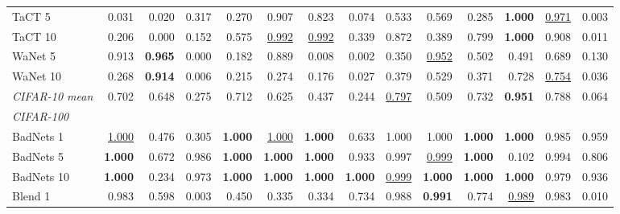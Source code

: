 \begin{table}[htbp]
\begin{adjustbox}{max width=\textwidth}
\begin{tabular}{lrrrrrrrrrrrrr}
TaCT 5 & \textcolor{black!45}{0.031} & \textcolor{black!45}{0.020} & \textcolor{black!45}{0.317} & \textcolor{black!45}{0.270} & 0.907 & 0.823 & \textcolor{black!45}{0.074} & 0.533 & 0.569 & \textcolor{black!45}{0.285} & \textbf{1.000} & \underline{0.971} & \textcolor{black!45}{0.003} \\
TaCT 10 & \textcolor{black!45}{0.206} & \textcolor{black!45}{0.000} & \textcolor{black!45}{0.152} & 0.575 & \underline{0.992} & \underline{0.992} & \textcolor{black!45}{0.339} & 0.872 & \textcolor{black!45}{0.389} & 0.799 & \textbf{1.000} & 0.908 & \textcolor{black!45}{0.011} \\
WaNet 5 & 0.913 & \textbf{0.965} & \textcolor{black!45}{0.000} & \textcolor{black!45}{0.182} & 0.889 & \textcolor{black!45}{0.008} & \textcolor{black!45}{0.002} & \textcolor{black!45}{0.350} & \underline{0.952} & 0.502 & \textcolor{black!45}{0.491} & 0.689 & \textcolor{black!45}{0.130} \\
WaNet 10 & \textcolor{black!45}{0.268} & \textbf{0.914} & \textcolor{black!45}{0.006} & \textcolor{black!45}{0.215} & \textcolor{black!45}{0.274} & \textcolor{black!45}{0.176} & \textcolor{black!45}{0.027} & \textcolor{black!45}{0.379} & 0.529 & \textcolor{black!45}{0.371} & 0.728 & \underline{0.754} & \textcolor{black!45}{0.036} \\
\rowcolor{black!8}\emph{CIFAR-10 mean} & 0.702 & 0.648 & \textcolor{black!45}{0.275} & 0.712 & 0.625 & \textcolor{black!45}{0.437} & \textcolor{black!45}{0.244} & \underline{0.797} & 0.509 & 0.732 & \textbf{0.951} & 0.788 & \textcolor{black!45}{0.064} \\
\multicolumn{14}{l}{\emph{CIFAR-100}} \\
BadNets 1 & \underline{1.000} & \textcolor{black!45}{0.476} & \textcolor{black!45}{0.305} & \textbf{1.000} & \underline{1.000} & \textbf{1.000} & 0.633 & 1.000 & 1.000 & \textbf{1.000} & \textbf{1.000} & 0.985 & 0.959 \\
BadNets 5 & \textbf{1.000} & 0.672 & 0.986 & \textbf{1.000} & \textbf{1.000} & \textbf{1.000} & 0.933 & 0.997 & \underline{0.999} & \textbf{1.000} & \textcolor{black!45}{0.102} & 0.994 & 0.806 \\
BadNets 10 & \textbf{1.000} & \textcolor{black!45}{0.234} & 0.973 & \textbf{1.000} & \textbf{1.000} & \textbf{1.000} & \textbf{1.000} & \underline{0.999} & \textbf{1.000} & \textbf{1.000} & \textbf{1.000} & 0.979 & 0.936 \\
Blend 1 & 0.983 & 0.598 & \textcolor{black!45}{0.003} & \textcolor{black!45}{0.450} & \textcolor{black!45}{0.335} & \textcolor{black!45}{0.334} & 0.734 & 0.988 & \textbf{0.991} & 0.774 & \underline{0.989} & 0.983 & \textcolor{black!45}{0.010} \\

\end{tabular}
\end{adjustbox}
\end{table}
